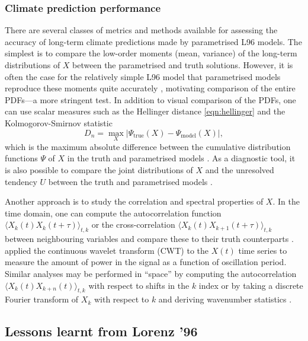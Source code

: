 \documentclass[titlepage,twoside]{article}
\numberwithin{equation}{section}
\begin{document}
\subsubsection{Climate prediction performance}
There are several classes of metrics and methods available for assessing the
accuracy of long-term climate predictions made by parametrised L96 models. The
simplest is to compare the low-order moments (mean, variance) of the long-term
distributions of $X$ between the parametrised and truth solutions. However, it
is often the case for the relatively simple L96 model that parametrised models
reproduce these moments quite accurately \parencite{wilks2005}, motivating
comparison of the entire PDFs---a more stringent test. In addition to visual
comparison of the PDFs, one can use scalar measures such as the Hellinger
distance \cref{eqn:hellinger} \parencite{arnold2013,gagne2020} and the
Kolmogorov-Smirnov statistic
\begin{equation*}
    D_n = \max_X |\Psi_\mathrm{true}(X) - \Psi_\mathrm{model}(X)|,
\end{equation*}
which is the maximum absolute difference between the cumulative distribution
functions $\Psi$ of $X$ in the truth and parametrised models
\parencite{wilks2005,chorin2015,kwasniok2012}. As a diagnostic tool, it is
also possible to compare the joint distributions of $X$ and the unresolved
tendency $U$ between the truth and parametrised models \parencite{gagne2020}.

Another approach is to study the correlation and spectral properties of $X$. In
the time domain, one can compute the autocorrelation function $\langle X_k(t)
X_k(t + \tau) \rangle_{t,k}$ or the cross-correlation $\langle X_k(t) X_{k+1}(t
+ \tau) \rangle_{t,k}$ between neighbouring variables and compare these to
their truth counterparts
\parencite{crommelin2008,kwasniok2012,chorin2015,gagne2020}.
\textcite{gagne2020} applied the continuous wavelet transform (CWT) to the
$X(t)$ time series to measure the amount of power in the signal as a function
of oscillation period. Similar analyses may be performed in ``space'' by
computing the autocorrelation $\langle X_k(t) X_{k+n}(t) \rangle_{t,k}$ with
respect to shifts in the $k$ index \parencite{gagne2020} or by taking a
discrete Fourier transform of $X_k$ with respect to $k$ and deriving
wavenumber statistics \parencite{crommelin2008,kwasniok2012}.


\subsection{Lessons learnt from Lorenz '96}
\end{document}
